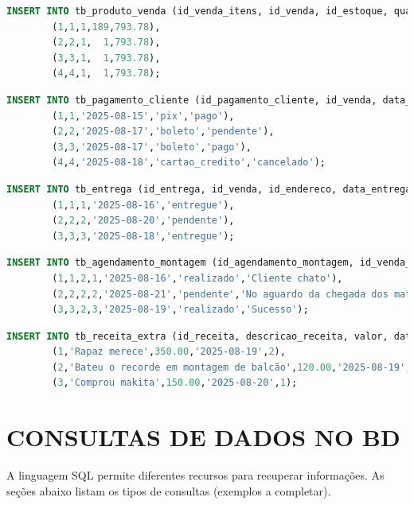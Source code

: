 \documentclass[
12pt,
a4paper,
semrecuonosumario,
sumario = abnt-6027-2012]{report}
\begin{document}
    \begin{lstlisting}[language=SQL,caption={DML -- Tabela \texttt{tb\_produto\_venda}}]
		INSERT INTO tb_produto_venda (id_venda_itens, id_venda, id_estoque, quantidade, valor) VALUES
		(1,1,1,189,793.78),
		(2,2,1,  1,793.78),
		(3,3,1,  1,793.78),
		(4,4,1,  1,793.78);
    \end{lstlisting}
    
    \begin{lstlisting}[language=SQL,caption={DML -- Tabela \texttt{tb\_pagamento\_cliente}}]
		INSERT INTO tb_pagamento_cliente (id_pagamento_cliente, id_venda, data_pagamento, forma_pagamento, status_pagamento) VALUES
		(1,1,'2025-08-15','pix','pago'),
		(2,2,'2025-08-17','boleto','pendente'),
		(3,3,'2025-08-17','boleto','pago'),
		(4,4,'2025-08-18','cartao_credito','cancelado');
    \end{lstlisting}
    
    \begin{lstlisting}[language=SQL,caption={DML -- Tabela \texttt{tb\_entrega}}]
		INSERT INTO tb_entrega (id_entrega, id_venda, id_endereco, data_entrega, status_entrega) VALUES
		(1,1,1,'2025-08-16','entregue'),
		(2,2,2,'2025-08-20','pendente'),
		(3,3,3,'2025-08-18','entregue');
    \end{lstlisting}
    
    \begin{lstlisting}[language=SQL,caption={DML -- Tabela \texttt{tb\_agendamento\_montagem}}]
		INSERT INTO tb_agendamento_montagem (id_agendamento_montagem, id_venda_itens, id_funcionario, id_endereco, data, status_montagem, observacao) VALUES
		(1,1,2,1,'2025-08-16','realizado','Cliente chato'),
		(2,2,2,2,'2025-08-21','pendente','No aguardo da chegada dos materiais'),
		(3,3,2,3,'2025-08-19','realizado','Sucesso');
    \end{lstlisting}
    
    \begin{lstlisting}[language=SQL,caption={DML -- Tabela \texttt{tb\_receita\_extra}}]
		INSERT INTO tb_receita_extra (id_receita, descricao_receita, valor, data_recebimento, id_funcionario) VALUES
		(1,'Rapaz merece',350.00,'2025-08-19',2),
		(2,'Bateu o recorde em montagem de balcão',120.00,'2025-08-19',3),
		(3,'Comprou makita',150.00,'2025-08-20',1);
    \end{lstlisting}


\chapter{CONSULTAS DE DADOS NO BD}\label{chap:consultas}
A linguagem SQL permite diferentes recursos para recuperar informações.
As seções abaixo listam os tipos de consultas (exemplos a completar).
    
\end{document}
